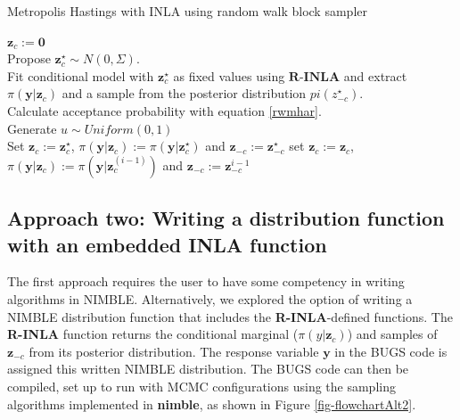 \documentclass[
]{article}
\begin{document}
\begin{algorithm}
\caption{Metropolis Hastings with INLA using random walk block sampler}\label{alg:altone}
\begin{algorithmic}
  \State $\mathbf{z}_{c} := \mathbf{0} $
  \EndIf
\\
  \State Propose $\mathbf{z}_c^{\star} \sim N(0, \Sigma) $. \\
  \State Fit conditional model with $\mathbf{z}_c^{\star}$ as fixed values using $\textbf{R-INLA}$ and extract $\pi(\mathbf{y}| \mathbf{z}_{c})$ and a sample from the posterior distribution $pi(z_{-c}^{\star})$. \\
  \State Calculate acceptance probability with equation \eqref{rwmhar}. \\
  \State Generate $u \sim Uniform(0,1)$ \\
  \State Set $\mathbf{z}_{c} := \mathbf{z}_c^{\star}$, $\pi(\mathbf{y}| \mathbf{z}_{c}) := \pi(\mathbf{y}| \mathbf{z}_{c}^{\star})$ and $\mathbf{z}_{-c} := \mathbf{z}_{-c}^{\star}$
  \Else 
  \State set $\mathbf{z}_{c} := \mathbf{z}_c$, $\pi(\mathbf{y}| \mathbf{z}_{c}) := \pi(\mathbf{y}| \mathbf{z}_{c}^{(i-1)})$ and $\mathbf{z}_{-c} := \mathbf{z}_{-c}^{i-1}$
  \EndIf
  
\EndFor
\end{algorithmic}
\end{algorithm}

\hypertarget{approach-two-writing-a-distribution-function-with-an-embedded-inla-function}{%
\subsection{\texorpdfstring{Approach two: Writing a distribution
function with an embedded INLA function
\label{alttwo}}{Approach two: Writing a distribution function with an embedded INLA function }}\label{approach-two-writing-a-distribution-function-with-an-embedded-inla-function}}

The first approach requires the user to have some competency in writing
algorithms in NIMBLE. Alternatively, we explored the option of writing a
NIMBLE distribution function that includes the \textbf{R-INLA}-defined
functions. The \textbf{R-INLA} function returns the conditional marginal
(\(\pi(y|\mathbf{z}_{c})\)) and samples of \(\mathbf{z}_{-c}\) from its
posterior distribution. The response variable \(\textbf{y}\) in the BUGS
code is assigned this written NIMBLE distribution. The BUGS code can
then be compiled, set up to run with MCMC configurations using the
sampling algorithms implemented in \textbf{nimble}, as shown in Figure
\ref{fig-flowchartAlt2}.
\end{document}
